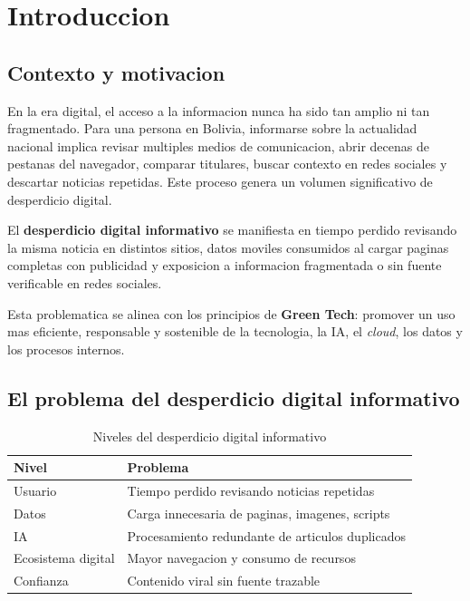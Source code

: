 \documentclass[12pt,oneside]{report}
\begin{document}
\chapter{Introduccion}

\section{Contexto y motivacion}

En la era digital, el acceso a la informacion nunca ha sido tan amplio ni tan fragmentado. Para una persona en Bolivia, informarse sobre la actualidad nacional implica revisar multiples medios de comunicacion, abrir decenas de pestanas del navegador, comparar titulares, buscar contexto en redes sociales y descartar noticias repetidas. Este proceso genera un volumen significativo de desperdicio digital.

El \textbf{desperdicio digital informativo} se manifiesta en tiempo perdido revisando la misma noticia en distintos sitios, datos moviles consumidos al cargar paginas completas con publicidad y exposicion a informacion fragmentada o sin fuente verificable en redes sociales.

Esta problematica se alinea con los principios de \textbf{Green Tech}: promover un uso mas eficiente, responsable y sostenible de la tecnologia, la IA, el \textit{cloud}, los datos y los procesos internos.

\section{El problema del desperdicio digital informativo}

\begin{table}[H]
\centering
\begin{tabular}{lp{10cm}}
\toprule
\textbf{Nivel} & \textbf{Problema} \\
\midrule
Usuario & Tiempo perdido revisando noticias repetidas \\
Datos & Carga innecesaria de paginas, imagenes, scripts \\
IA & Procesamiento redundante de articulos duplicados \\
Ecosistema digital & Mayor navegacion y consumo de recursos \\
Confianza & Contenido viral sin fuente trazable \\
\bottomrule
\end{tabular}
\caption{Niveles del desperdicio digital informativo}
\end{table}
\end{document}
